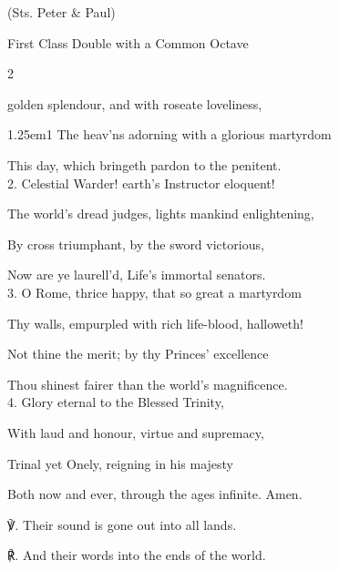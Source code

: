 \centerline{\small{(Sts. Peter \& Paul)}}

\begin{inhead}
	First Class Double with a Common Octave
\end{inhead}



\begin{paracol}{2}
\sloppy

\firstEvensong
{}

\firstEvensongHymn
{} golden splendour, and with roseate loveliness,


\begin{hangparas}{1.25em}{1}
The heav'ns adorning with a glorious martyrdom

This day, which bringeth pardon to the penitent.\\

2. Celestial Warder! earth’s Instructor eloquent!

The world's dread judges, lights mankind enlightening,

By cross triumphant, by the sword victorious,

Now are ye laurell'd, Life’s immortal senators.\\

3. O Rome, thrice happy, that so great a martyrdom

Thy walls, empurpled with rich life-blood, halloweth!

Not thine the merit; by thy Princes' excellence

Thou shinest fairer than the world's magnificence.\\

4. Glory eternal to the Blessed Trinity,

With laud and honour, virtue and supremacy,

Trinal yet Onely, reigning in his majesty

Both now and ever, through the ages infinite. Amen.\\
\end{hangparas}

℣. Their sound is gone out into all lands.

℟. And their words into the ends of the world.


\end{paracol}
